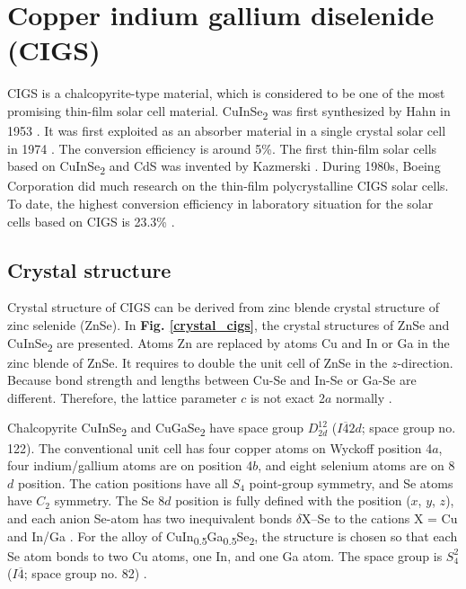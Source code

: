 \documentclass[a4paper, 12pt, titlepage,oneside,drop]{kthesis}
\begin{document}
\section{Copper indium gallium diselenide (CIGS)}
CIGS is a chalcopyrite-type material, which is considered to be one of the most promising thin-film solar cell material. 
CuInSe\textsubscript{2} was first synthesized by Hahn in 1953 \cite{ZAAC}. It was first exploited as an absorber material in a single crystal solar cell in 1974 \cite{CuInSe21974}. The conversion efficiency is around 
5\%. The first thin-film solar cells based on CuInSe\textsubscript{2} and CdS was invented by Kazmerski \cite{kazmerski1976thin}. During 1980s, Boeing Corporation did much research on the thin-film polycrystalline CIGS solar cells. 
To date, the highest conversion efficiency in laboratory situation for the solar cells based on CIGS is 23.3\% \cite{ward2014cu}.


\subsection{Crystal structure}
Crystal structure of CIGS can be derived from zinc blende crystal structure of zinc selenide (ZnSe). In \textbf{Fig. \ref{crystal_cigs}}, the crystal structures of ZnSe and CuInSe\textsubscript{2} are presented. 
Atoms Zn are replaced by atoms Cu and In or Ga in the zinc blende of ZnSe. It requires to double the unit cell of ZnSe in the $z$-direction. Because bond strength and lengths between
Cu-Se and In-Se or Ga-Se are different. Therefore, the lattice parameter $c$ is not exact 2$a$ normally \cite{chen2009crystal}.

Chalcopyrite CuInSe\textsubscript{2} and CuGaSe\textsubscript{2} have space group $D_{2d}^{12}$ ($I\overline{4}2d$; space group no. 122).
The conventional unit cell has four copper atoms on Wyckoff position 4$a$, four indium/gallium atoms are on position 4$b$, and eight selenium atoms are on 8$d$ position. 
The cation positions have all $S_4$ point-group symmetry, and Se atoms have $C_2$ symmetry. 
The Se 8$d$ position is fully defined with the position ($x$, $y$, $z$), and each anion Se-atom has two inequivalent bonds $\delta$X–Se to the cations X = Cu and In/Ga \cite{parlak2006ab, hones2008polarization,persson2008anisotropic}. 
For the alloy of CuIn\textsubscript{0.5}Ga\textsubscript{0.5}Se\textsubscript{2}, the structure is chosen so that each Se atom bonds to two Cu atoms, one In, and one Ga atom. The space group is $S_{4}^{2}$ ($I\overline{4}$; space 
group no. 82) \cite{li2011electronic}.
\end{document}
